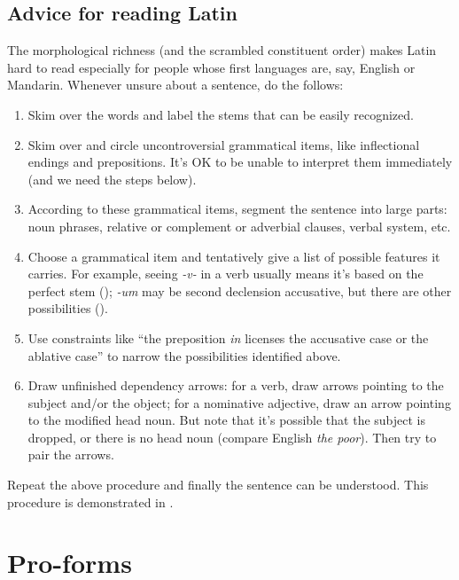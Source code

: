 \documentclass[a4paper, oneside, 12pt]{report}
\newcommand{\form}[1]{\emph{#1}}
\begin{document}
\section{Advice for reading Latin}

The morphological richness (and the scrambled constituent order)
makes Latin hard to read 
especially for people whose first languages are, say, 
English or Mandarin. 
Whenever unsure about a sentence, do the follows: 
\begin{enumerate}
    \item Skim over the words and label the stems that can be easily recognized.  
    \item Skim over and circle uncontroversial grammatical items,  
        like inflectional endings and prepositions. 
        It's OK to be unable to interpret them immediately (and we need the steps below).
    \item According to these grammatical items, 
        segment the sentence into large parts:
        noun phrases, relative or complement or adverbial clauses, 
        verbal system, etc.
    \item Choose a grammatical item and tentatively give a list of possible features it carries.  
        For example, seeing \form{-v-} in a verb usually means
        it's based on the perfect stem
        ();
        \form{-um} may be second declension accusative,
        but there are other possibilities
        (). 
    \item Use constraints like 
        ``the preposition \form{in} licenses the accusative case or the ablative case'' 
        to narrow the possibilities identified above.
    \item Draw unfinished dependency arrows:
        for a verb, draw arrows pointing to the subject and/or the object; 
        for a nominative adjective, draw an arrow pointing to the modified head noun. 
        But note that it's possible that the subject is dropped, 
        or there is no head noun (compare English \form{the poor}).
        Then try to pair the arrows.
\end{enumerate}
Repeat the above procedure and finally the sentence can be understood. 
This procedure is demonstrated in .

\chapter{Pro-forms}\label{chap:pro-forms}
\end{document}
